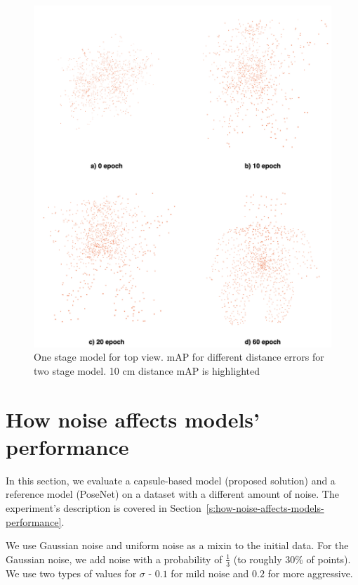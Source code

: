 \begin{figure}[htbp]
    \centerline{\includegraphics[scale=0.25]{Figures/reconstruction-example.png}}
    \caption{One stage model for top view. mAP for different distance errors for two stage model. 10 cm distance mAP is highlighted}
    \label{img:reconstruction-example}
\end{figure}


\section{How noise affects models' performance}
\label{s:experiment-noise}

In this section, we evaluate a capsule-based model (proposed solution) and a reference model (PoseNet) on a dataset with a different amount of noise. The experiment's description is covered in Section~\ref{s:how-noise-affects-models-performance}.

We use Gaussian noise and uniform noise as a mixin to the initial data. For the Gaussian noise, we add noise with a probability of $\frac{1}{3}$ (to roughly 30\% of points). We use two types of values for $\sigma$ - $0.1$ for mild noise and $0.2$ for more aggressive.

